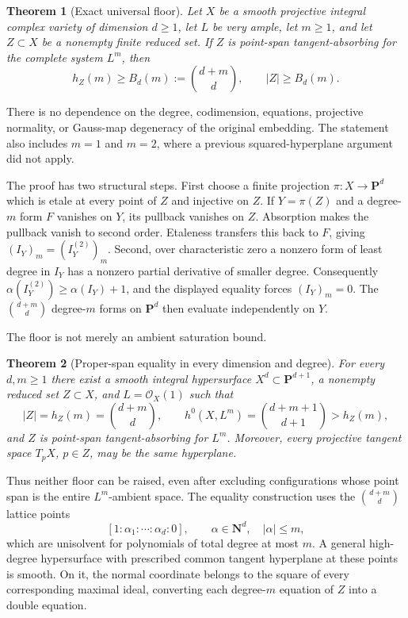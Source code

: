 \documentclass[11pt]{article}
\newtheorem{theorem}{Theorem}[section]
\newcommand{\PP}{\mathbf P}
\newcommand{\NN}{\mathbf N}
\newcommand{\cO}{\mathcal O}
\newcommand{\BZ}{B_d(m)}
\begin{document}
\begin{theorem}[Exact universal floor]\label{thm:exact-floor}
Let $X$ be a smooth projective integral complex variety of dimension $d\geq1$,
let $L$ be very ample, let $m\geq1$, and let $Z\subset X$ be a nonempty finite
reduced set.  If $Z$ is point-span tangent-absorbing for the complete system
$L^m$, then
\begin{equation}\label{eq:exact-floor}
 h_Z(m)\geq \BZ:=\binom{d+m}{d},
 \qquad |Z|\geq \BZ.
\end{equation}
\end{theorem}

There is no dependence on the degree, codimension, equations, projective
normality, or Gauss-map degeneracy of the original embedding.  The statement
also includes $m=1$ and $m=2$, where a previous squared-hyperplane argument
did not apply.

The proof has two structural steps.  First choose a finite projection
$\pi:X\to\PP^d$ which is etale at every point of $Z$ and injective on $Z$.
If $Y=\pi(Z)$ and a degree-$m$ form $F$ vanishes on $Y$, its pullback vanishes
on $Z$.  Absorption makes the pullback vanish to second order.  Etaleness
transfers this back to $F$, giving
$(I_Y)_m=(I_Y^{(2)})_m$.  Second, over characteristic zero a nonzero form of
least degree in $I_Y$ has a nonzero partial derivative of smaller degree.
Consequently $\alpha(I_Y^{(2)})\geq\alpha(I_Y)+1$, and the displayed equality
forces $(I_Y)_m=0$.  The $\binom{d+m}{d}$ degree-$m$ forms on $\PP^d$ then
evaluate independently on $Y$.

The floor is not merely an ambient saturation bound.

\begin{theorem}[Proper-span equality in every dimension and degree]
\label{thm:sharpness}
For every $d,m\geq1$ there exist a smooth integral hypersurface
$X^d\subset\PP^{d+1}$, a nonempty reduced set $Z\subset X$, and
$L=\cO_X(1)$ such that
\[
 |Z|=h_Z(m)=\binom{d+m}{d},\qquad
 h^0(X,L^m)=\binom{d+m+1}{d+1}>h_Z(m),
\]
and $Z$ is point-span tangent-absorbing for $L^m$.  Moreover, every
projective tangent space $T_pX$, $p\in Z$, may be the same hyperplane.
\end{theorem}

Thus neither floor can be raised, even after excluding configurations whose
point span is the entire $L^m$-ambient space.  The equality construction uses
the $\binom{d+m}{d}$ lattice points
\[
 [1:\alpha_1:\cdots:\alpha_d:0],\qquad
 \alpha\in\NN^d,\quad |\alpha|\leq m,
\]
which are unisolvent for polynomials of total degree at most $m$.  A general
high-degree hypersurface with prescribed common tangent hyperplane at these
points is smooth.  On it, the normal coordinate belongs to the square of
every corresponding maximal ideal, converting each degree-$m$ equation of
$Z$ into a double equation.
\end{document}

